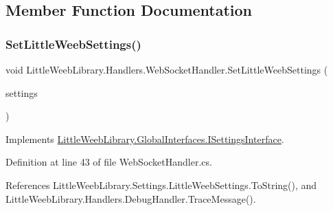 \subsection{Member Function Documentation}
\mbox{\label{class_little_weeb_library_1_1_handlers_1_1_web_socket_handler_a7ca1faf86f9796afd4c9981a7c961f3b}} 
\subsubsection{\texorpdfstring{Set\+Little\+Weeb\+Settings()}{SetLittleWeebSettings()}}
{\footnotesize\ttfamily void Little\+Weeb\+Library.\+Handlers.\+Web\+Socket\+Handler.\+Set\+Little\+Weeb\+Settings (\begin{DoxyParamCaption}\item[{\mbox{\hyperlink{class_little_weeb_library_1_1_settings_1_1_little_weeb_settings}{Little\+Weeb\+Settings}}}]{settings }\end{DoxyParamCaption})}



Implements \mbox{\hyperlink{interface_little_weeb_library_1_1_global_interfaces_1_1_i_settings_interface_a5c53e44105f1f4c7f8c3e546d29939d7}{Little\+Weeb\+Library.\+Global\+Interfaces.\+I\+Settings\+Interface}}.



Definition at line 43 of file Web\+Socket\+Handler.\+cs.



References Little\+Weeb\+Library.\+Settings.\+Little\+Weeb\+Settings.\+To\+String(), and Little\+Weeb\+Library.\+Handlers.\+Debug\+Handler.\+Trace\+Message().


